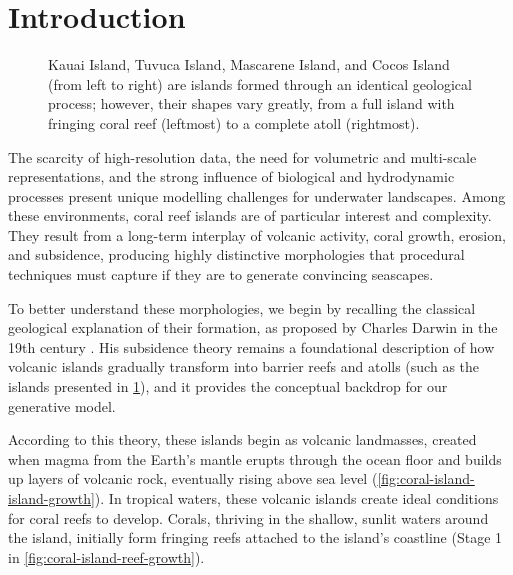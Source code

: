
\section{Introduction}
\label{sec:coral-island-introduction}

\begin{figure}[H]
    \caption[Different islands with coral reefs]{Kauai Island, Tuvuca Island, Mascarene Island, and Cocos Island (from left to right) are islands formed through an identical geological process; however, their shapes vary greatly, from a full island with fringing coral reef (leftmost) to a complete atoll (rightmost).}
    \label{fig:coral-island-island-examples}
\end{figure}

The scarcity of high-resolution data, the need for volumetric and multi-scale representations, and the strong influence of biological and hydrodynamic processes present unique modelling challenges for underwater landscapes. Among these environments, coral reef islands are of particular interest and complexity. They result from a long-term interplay of volcanic activity, coral growth, erosion, and subsidence, producing highly distinctive morphologies that procedural techniques must capture if they are to generate convincing seascapes. %

To better understand these morphologies, we begin by recalling the classical geological explanation of their formation, as proposed by Charles Darwin in the 19th century \cite{Darwin1842}. His subsidence theory remains a foundational description of how volcanic islands gradually transform into barrier reefs and atolls (such as the islands presented in \cref{fig:coral-island-island-examples}), and it provides the conceptual backdrop for our generative model.

According to this theory, these islands begin as volcanic landmasses, created when magma from the Earth's mantle erupts through the ocean floor and builds up layers of volcanic rock, eventually rising above sea level (\cref{fig:coral-island-island-growth}). In tropical waters, these volcanic islands create ideal conditions for coral reefs to develop. Corals, thriving in the shallow, sunlit waters around the island, initially form fringing reefs attached to the island's coastline (Stage 1 in \cref{fig:coral-island-reef-growth}).

